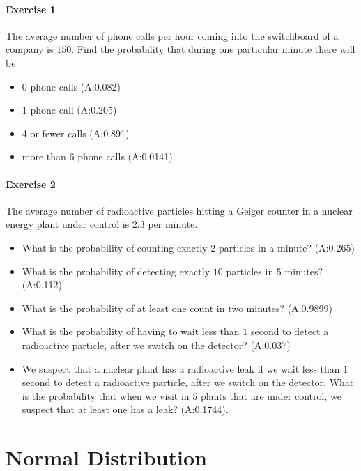 \documentclass[
]{book}
\providecommand{\tightlist}{%
  \setlength{\itemsep}{0pt}\setlength{\parskip}{0pt}}
\begin{document}
\hypertarget{exercise-1-5}{%
\subsubsection{Exercise 1}\label{exercise-1-5}}

The average number of phone calls per hour coming into the switchboard of a company is \(150\). Find the probability that during one particular minute there will be

\begin{itemize}
\tightlist
\item
  0 phone calls (A:0.082)
\item
  1 phone call (A:0.205)
\item
  4 or fewer calls (A:0.891)
\item
  more than 6 phone calls (A:0.0141)
\end{itemize}

\hypertarget{exercise-2-5}{%
\subsubsection{Exercise 2}\label{exercise-2-5}}

The average number of radioactive particles hitting a Geiger counter in a nuclear energy plant under control is \(2.3\) per minute.

\begin{itemize}
\item
  What is the probability of counting exactly \(2\) particles in a minute? (A:0.265)
\item
  What is the probability of detecting exactly \(10\) particles in \(5\) minutes? (A:0.112)
\item
  What is the probability of at least one count in two minutes? (A:0.9899)
\item
  What is the probability of having to wait less than \(1\) second to detect a radioactive particle, after we switch on the detector? (A:0.037)
\item
  We suspect that a nuclear plant has a radioactive leak if we wait less than \(1\) second to detect a radioactive particle, after we switch on the detector. What is the probability that when we visit in \(5\) plants that are under control, we suspect that at least one has a leak? (A:0.1744).
\end{itemize}

\hypertarget{normal-distribution}{%
\chapter{Normal Distribution}\label{normal-distribution}}
\end{document}
